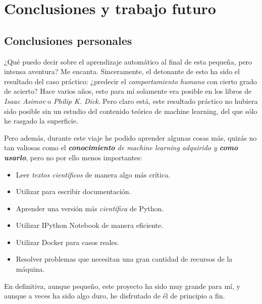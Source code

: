 \chapter{Conclusiones y trabajo futuro} \label{chap:6}

\vspace*{5mm}

\section{Conclusiones personales} \label{sec:6.1}

¿Qué puedo decir sobre el aprendizaje automático al final de esta pequeña, pero intensa aventura? Me encanta. Sinceramente, el detonante de esto ha sido el resultado del caso práctico: ¿predecir el \emph{comportamiento humano} con cierto grado de acierto? Hace varios años, esto para mí solamente era posible en los libros de \emph{Isaac Asimov} o \emph{Philip K. Dick}. Pero claro está, este resultado práctico no hubiera sido posible sin un estudio del contenido teórico de machine learning, del que sólo he rasgado la superficie.

Pero además, durante este viaje he podido aprender algunas cosas más, quizás no tan valiosas como el \emph{\textbf{conocimiento} de machine learning adquirido y \textbf{como usarlo}}, pero no por ello menos importantes:

\begin{itemize}
\item[\textbullet] Leer \emph{textos científicos} de manera algo más crítica.

\item[\textbullet] Utilizar  para escribir documentación.

\item[\textbullet] Aprender una versión más \emph{científica} de Python.

\item[\textbullet] Utilizar IPython Notebook de manera eficiente.

\item[\textbullet] Utilizar Docker para casos reales.

\item[\textbullet] Resolver problemas que necesitan una gran cantidad de recursos de la máquina.
\end{itemize}

En definitiva, aunque pequeño, este proyecto ha sido muy grande para mí, y aunque a veces ha sido algo duro, he disfrutado de él de principio a fin.

